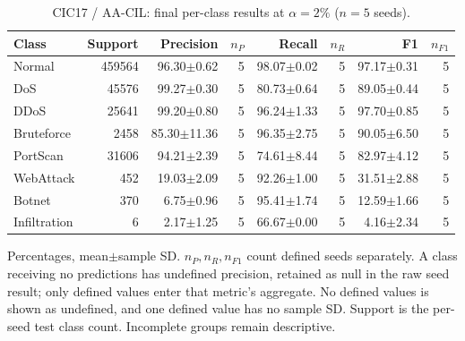\begin{table}[t]
\centering\scriptsize
\setlength{\tabcolsep}{3.3pt}
\caption{CIC17 / AA-CIL: final per-class results at $\alpha=2\%$ ($n=5$ seeds).}\label{tab:forgetting-class-cic_ids_2017-aacil}
\begin{tabular}{lrrrrrrr}
\toprule
Class & Support & Precision & $n_P$ & Recall & $n_R$ & F1 & $n_{F1}$ \\
\midrule
Normal & 459564 & 96.30$\pm$0.62 & 5 & 98.07$\pm$0.02 & 5 & 97.17$\pm$0.31 & 5 \\
DoS & 45576 & 99.27$\pm$0.30 & 5 & 80.73$\pm$0.64 & 5 & 89.05$\pm$0.44 & 5 \\
DDoS & 25641 & 99.20$\pm$0.80 & 5 & 96.24$\pm$1.33 & 5 & 97.70$\pm$0.85 & 5 \\
Bruteforce & 2458 & 85.30$\pm$11.36 & 5 & 96.35$\pm$2.75 & 5 & 90.05$\pm$6.50 & 5 \\
PortScan & 31606 & 94.21$\pm$2.39 & 5 & 74.61$\pm$8.44 & 5 & 82.97$\pm$4.12 & 5 \\
WebAttack & 452 & 19.03$\pm$2.09 & 5 & 92.26$\pm$1.00 & 5 & 31.51$\pm$2.88 & 5 \\
Botnet & 370 & 6.75$\pm$0.96 & 5 & 95.41$\pm$1.74 & 5 & 12.59$\pm$1.66 & 5 \\
Infiltration & 6 & 2.17$\pm$1.25 & 5 & 66.67$\pm$0.00 & 5 & 4.16$\pm$2.34 & 5 \\
\bottomrule
\end{tabular}
\par\smallskip\begin{minipage}{0.98\textwidth}\scriptsize Percentages, mean$\pm$sample SD. $n_P,n_R,n_{F1}$ count defined seeds separately. A class receiving no predictions has undefined precision, retained as null in the raw seed result; only defined values enter that metric's aggregate. No defined values is shown as undefined, and one defined value has no sample SD. Support is the per-seed test class count. Incomplete groups remain descriptive.\end{minipage}
\end{table}

